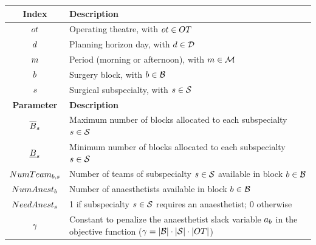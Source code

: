 \begin{table}[t!]
\begin{tabular}{cl}
    \midrule
    \textbf{Index}                           & \textbf{Description}                                                                  \\
    \midrule
        $ot$                            & Operating theatre, with $ot \in OT$                                       \\
        $d$                 & Planning horizon day, with $d \in \mathcal{D}$ \\
        $m$                      & Period (morning or afternoon), with $m \in \mathcal{M}$           \\
        $b$                           & Surgery block, with $b \in \mathcal{B}$                                    \\
        $s$                       & Surgical subspecialty, with $s \in \mathcal{S}$                      \\
    \midrule
    \textbf{Parameter}                        & \textbf{Description}                                                                  \\
    \midrule
        $\overline{B}_{s}$                                         & Maximum number of blocks allocated to each subspecialty $s \in \mathcal{S}$            \\
        $\underline{B}_{s}$                                         & Minimum number of blocks allocated to each subspecialty $s \in \mathcal{S}$            \\
        $NumTeam_{b,s}$              & Number of teams of subspecialty $s \in \mathcal{S}$ available in block  $b \in \mathcal{B}$ \\
        $NumAnest_{b}$                       & Number of anaesthetists available in block $b \in \mathcal{B}$                         \\
        $NeedAnest_{s}$                       & 1 if subspecialty $s \in \mathcal{S}$ requires an anaesthetist; 0 otherwise         \\    
        $\gamma$                                   & Constant to penalize the anaesthetist slack variable $a_{b}$ in the objective function ($\gamma = |\mathcal{B}|\cdot|\mathcal{S}|\cdot|OT|$) \\

\end{tabular}
\end{table}
